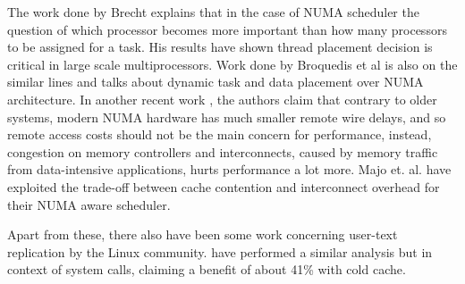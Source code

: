 The work done by Brecht \cite{Brecht:1993:IPA:1295480.1295481} explains that in the case of 
NUMA scheduler the question of which processor becomes more important than how many processors to be assigned for a task.
His results have shown thread placement decision is critical in large scale multiprocessors.
Work done by Broquedis et al \cite{numaScheduling} is also on the similar lines and talks about
dynamic task and data placement over NUMA architecture.
In another recent work \cite{Dashti:2013:TMH:2490301.2451157}, the authors claim that contrary to 
older systems, modern NUMA hardware has much smaller remote wire delays, and so remote access
costs should not be the main concern for performance, instead, 
congestion on memory controllers and interconnects, caused by memory traffic from 
data-intensive applications, hurts performance a lot more.
Majo et. al. \cite{Majo:2011:MMN:1993478.1993481} have exploited the trade-off 
between cache contention and interconnect overhead for their NUMA aware scheduler.

Apart from these, there also have been some work concerning user-text replication by the
Linux community. \cite{textReplication} have performed a similar analysis but in context of
system calls, claiming a benefit of about 41\% with cold cache.

